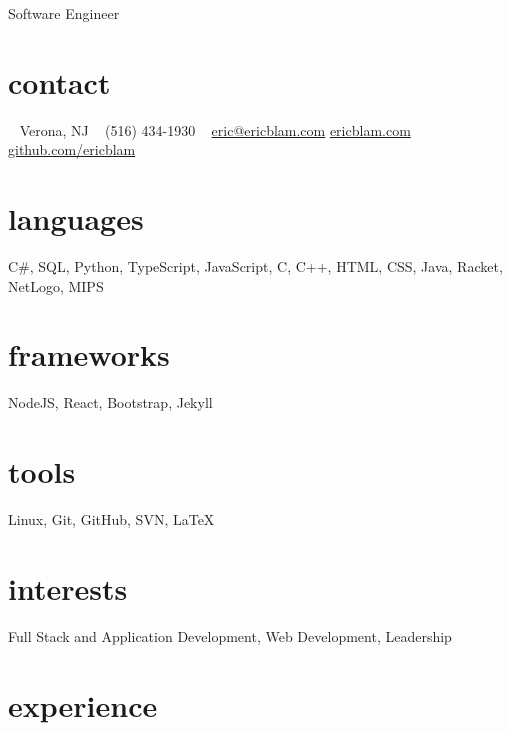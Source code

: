 \documentclass[]{friggeri-cv}
\begin{document}
       {Software Engineer}

\begin{aside}
  \section{contact}
    ~
    Verona, NJ
    ~
    (516) 434-1930
    ~
    \href{mailto:eric@ericblam.com}{eric@ericblam.com}
    \href{https://ericblam.com}{ericblam.com}
    \href{https://github.com/ericblam}{github.com/ericblam}
  \section{languages}
    C\#, SQL, Python, TypeScript, JavaScript, C, C++, HTML, CSS, Java, Racket, NetLogo, MIPS
  \section{frameworks}
    NodeJS, React, Bootstrap, Jekyll
  \section{tools}
    Linux, Git, GitHub, SVN, \LaTeX
\end{aside}

\section{interests}

Full Stack and Application Development, Web Development, Leadership

\section{experience}
\end{document}
